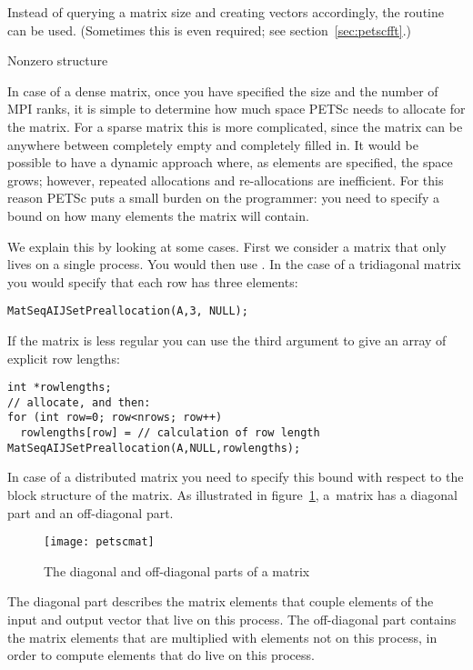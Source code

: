 Instead of querying a matrix size and creating vectors accordingly,
the routine  can be used.
(Sometimes this is even required; see section~\ref{sec:petscfft}.)

 {Nonzero structure}

In case of a dense matrix, once you have specified the size and the
number of MPI ranks, it is simple to determine how much space PETSc
needs to allocate for the matrix. For a sparse matrix this is more
complicated, since the matrix can be anywhere between completely empty
and completely filled in. It would be possible to have a dynamic
approach where, as elements are specified, the space grows; however,
repeated allocations and re-allocations are inefficient. For this
reason PETSc puts a small burden on the programmer: you need to
specify a bound on how many elements the matrix will contain.

We explain this by looking at some cases. First we consider a matrix
that only lives on a single process. You would then use
.  In
the case of a tridiagonal matrix you would specify that each row has
three elements:
%
\begin{lstlisting}
MatSeqAIJSetPreallocation(A,3, NULL);
\end{lstlisting}

If the matrix is less regular you can use the third argument to give
an array of explicit row lengths:
\begin{lstlisting}
int *rowlengths;
// allocate, and then:
for (int row=0; row<nrows; row++)
  rowlengths[row] = // calculation of row length
MatSeqAIJSetPreallocation(A,NULL,rowlengths);
\end{lstlisting}

In case of a distributed matrix you need to specify this bound with
respect to the block structure of the matrix. As illustrated in figure~\ref{fig:petscmat},
a~matrix has a diagonal part and an off-diagonal part.
%
\begin{figure}[ht]
  \texttt{[image: petscmat]}
  \caption{The diagonal and off-diagonal parts of a matrix}
  \label{fig:petscmat}
\end{figure}
%
The diagonal part describes the matrix elements that couple elements of the
input and output vector that live on this process. The off-diagonal part contains the
matrix elements that are multiplied with elements not on this process, in order to compute
elements that do live on this process.

